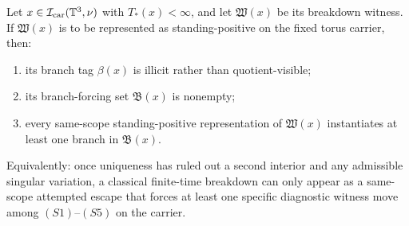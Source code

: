 \begin{theorem}\label{thm:constructive-branch-forcing}
Let $x\in\mathcal I_{\mathrm{car}}(\mathbb{T}^3,\nu)$ with $T_*(x)<\infty$, and let $\mathfrak W(x)$ be its breakdown witness.
If $\mathfrak W(x)$ is to be represented as standing-positive on the fixed torus carrier, then:
\begin{enumerate}[label=(\roman*), leftmargin=2.2em]
\item its branch tag $\beta(x)$ is illicit rather than quotient-visible;
\item its branch-forcing set $\mathfrak B(x)$ is nonempty;
\item every same-scope standing-positive representation of $\mathfrak W(x)$ instantiates at least one branch in $\mathfrak B(x)$.
\end{enumerate}
Equivalently: once uniqueness has ruled out a second interior and any admissible singular variation, a classical finite-time breakdown can only appear as a same-scope attempted escape that forces at least one specific diagnostic witness move among $(S1)$--$(S5)$ on the carrier.
\end{theorem}

